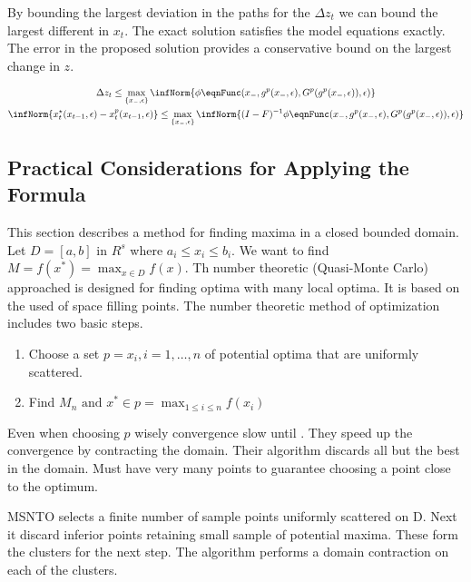 \documentclass[12pt]{article}
\begin{document}
By bounding the largest deviation in the paths for the $\Delta z_t$ we can bound the largest different in $x_t$.  The exact solution satisfies the model equations exactly.  The error in the proposed solution provides a conservative bound on the largest change in $z$.


  \begin{gather}
  \Delta z_t \le  \label{eq:3}
\max_{\{x_{-},\epsilon\}} \infNorm{ \phi \eqnFunc(x_{-},g^p(x_{-},\epsilon),G^p(g^p(x_{-},\epsilon)),\epsilon) }\\
	\infNorm{ x^\star_{t}(x_{t-1},\epsilon) -	 x^p_{t}(x_{t-1},\epsilon)} \le
\max_{\{x_{-},\epsilon\}} \infNorm{(I-F)^{-1} \phi \eqnFunc(x_{-},g^p(x_{-},\epsilon),G^p(g^p(x_{-},\epsilon)),\epsilon) }
  \end{gather}






\subsection{Practical Considerations for Applying the Formula}
\label{sec:practicalformula}



 
This section describes a method for finding maxima in a closed bounded domain.
Let $D=[a,b]$ in $R^s$ where $a_i \le x_i \le b_i$. We want to find  $M=f(x^\ast)= \max_{x \in D}f(x)$.
Th number theoretic (Quasi-Monte Carlo) approached is designed for finding optima with many local optima.  It is based on the used of space filling points.\cite{Xu2005}
The number theoretic method of optimization includes two basic steps.
\begin{enumerate}
\item Choose a set $p=x_i, i=1,\dots,n$ of potential optima that are uniformly scattered.
\item Find $M_n\text{ and } x^\ast \in p =\max_{1\le i \le n}f(x_i)$
\end{enumerate}

Even when choosing $p$ wisely convergence slow until \cite{Niederreiter1983}.  They speed up the convergence by contracting the domain.
Their algorithm discards all but the best in the domain. Must have very many points to guarantee choosing a point close to the optimum.


MSNTO selects a finite number of sample points uniformly scattered on D.  Next it discard inferior points retaining small sample of potential maxima.  These form the clusters for the next step.  The algorithm performs a domain contraction on each of the clusters.
\end{document}
